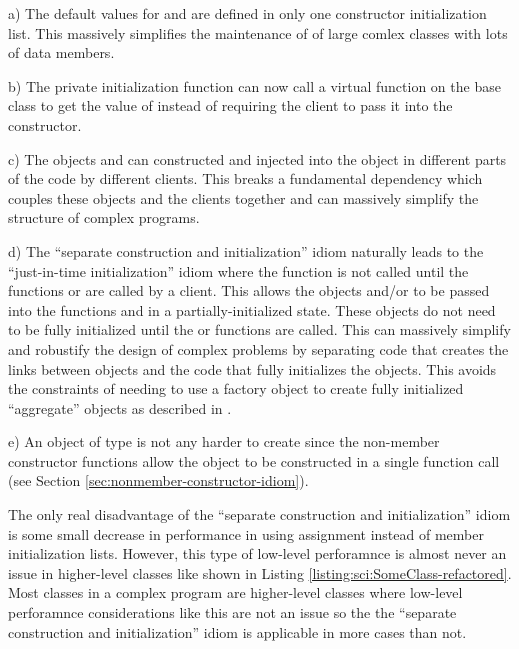 \documentclass[pdf,ps2pdf,11pt]{SANDreport}
\begin{document}
a) The default values for {} and
{} are defined in only one constructor
initialization list.  This massively simplifies the maintenance of of
large comlex classes with lots of data members.

b) The private initialization function
{} can now call a virtual function on
the base class {} to get the
value of {} instead of requiring the client to pass
it into the constructor.

c) The objects {} and {} can constructed and
injected into the {} object in different parts of
the code by different clients.  This breaks a fundamental dependency
which couples these objects and the clients together and can massively
simplify the structure of complex programs.

d) The ``separate construction and initialization'' idiom naturally
leads to the ``just-in-time initialization'' idiom where the
{} function is not called until the
functions {} or {} are
called by a client.  This allows the objects {} and/or
{} to be passed into the functions {} 
and {} in a partially-initialized state.  These
objects do not need to be fully initialized until the
{} or {} functions are
called.  This can massively simplify and robustify the design of
complex problems by separating code that creates the links between
objects and the code that fully initializes the objects.  This avoids
the constraints of needing to use a factory object to create fully
initialized ``aggregate'' objects as described in
{}\cite{DomainDrivenDesign}.

e) An object of type {} is not any harder to create
since the non-member constructor functions allow the object to be
constructed in a single function call (see Section
{}\ref{sec:nonmember-constructor-idiom}).

The only real disadvantage of the ``separate construction and
initialization'' idiom is some small decrease in performance in using
assignment instead of member initialization lists.  However, this type
of low-level perforamnce is almost never an issue in higher-level
classes like {} shown in Listing
{}\ref{listing:sci:SomeClass-refactored}.  Most classes in a complex
program are higher-level classes where low-level perforamnce
considerations like this are not an issue so the the ``separate
construction and initialization'' idiom is applicable in more cases
than not.
\end{document}
